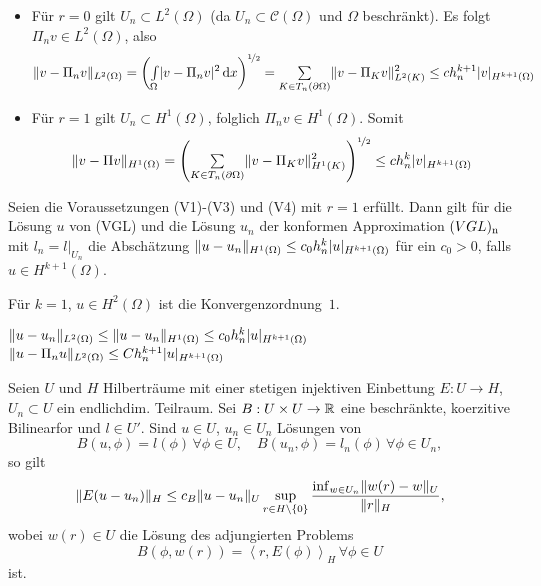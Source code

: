 \documentclass{cheat-sheet}
\newcommand{\Cont}{\mathcal{C}} %
\newcommand{\bOmega}{\partial \Omega} %
\newcommand{\tss}[1]{\textsubscript{#1}} %
\newcommand{\scp}[2]{\left\langle #1 , #2 \right\rangle} %
\begin{document}
\begin{bemn}
  \begin{itemize}
    \item Für $r = 0$ gilt $U_n \subset L^2(\Omega)$ (da $U_n \subset \Cont(\Omega)$ und $\Omega$ beschränkt).
    Es folgt $\Pi_n v \in L^2(\Omega)$, also
    \[
      \norm{v - \Pi_n v}_{L^2(\Omega)} = \left( \Int{\Omega}{}{\abs{v - \Pi_n v}^2}{x} \right)^{\nicefrac{1}{2}} = \sum_{K \in T_n(\bOmega)} \norm{v - \Pi_K v}^2_{L^2(K)} \leq c h_n^{k+1} \abs{v}_{H^{k+1}(\Omega)}
    \]
    \item Für $r = 1$ gilt $U_n \subset H^1(\Omega)$, folglich $\Pi_n v \in H^1(\Omega)$.
    Somit
    \[
      \norm{v - \Pi v}_{H^1(\Omega)} = \left( \sum_{K \in T_n(\bOmega)} \norm{v - \Pi_K v}^2_{H^1(K)} \right)^{\nicefrac{1}{2}} \leq c h_n^k \abs{v}_{H^{k+1}(\Omega)}
    \]
  \end{itemize}
\end{bemn}

\begin{satz}
  Seien die Voraussetzungen (V1)-(V3) und (V4) mit $r = 1$ erfüllt.
  Dann gilt für die Lösung $u$ von (VGL) und die Lösung $u_n$ der konformen Approximation $(VGL)\tss{n}$ mit $l_n = l|_{U_n}$ die Abschätzung $\lVert u - u_n\rVert_{H^1(\Omega)} \leq c_0 h_n^k \lvert u\rvert_{H^{k+1}(\Omega)}$ für ein $c_0 > 0$, falls $u \in H^{k+1}(\Omega)$.
\end{satz}

\begin{bem}
  Für $k=1$, $u \in H^2(\Omega)$ ist die Konvergenzordnung~$1$.
\end{bem}

\begin{bem}
  $\lVert u - u_n\rVert_{L^2(\Omega)} \leq \lVert u - u_n\rVert_{H^1(\Omega)} \leq c_0 h_n^k \lvert u\rvert_{H^{k+1}(\Omega)}$
  $\lVert u - \Pi_n u\rVert_{L^2(\Omega)} \leq C h_n^{k+1} \lvert u\rvert_{H^{k+1}(\Omega)}$
\end{bem}

\begin{satz}
  Seien $U$ und $H$ Hilberträume mit einer stetigen injektiven Einbettung $E : U \to H$, $U_n \subset U$ ein endlichdim. Teilraum.
  Sei $B : U \times U \to \mathbb{R}$ eine beschränkte, koerzitive Bilinearfor und $l \in U'$.
  Sind $u \in U$, $u_n \in U_n$ Lösungen von
  \[
    B(u, \phi) = l(\phi) \, \forall \phi \in U, \quad
    B(u_n, \phi) = l_n(\phi) \, \forall \phi \in U_n,
  \]
  so gilt
  \[
    \lVert E (u - u_n)\rVert_H \leq c_B \lVert u - u_n\rVert_{U} \sup_{r \in H \setminus \{ 0 \}} \frac{\inf_{w \in U_n} \lVert w(r) - w\rVert_U}{\lVert r\rVert_H},
  \]
  wobei $w(r) \in U$ die Lösung des adjungierten Problems
  \[
    B(\phi, w(r)) = \scp{r}{E(\phi)}_H \, \forall \phi \in U
  \]
  ist.
\end{satz}
\end{document}
